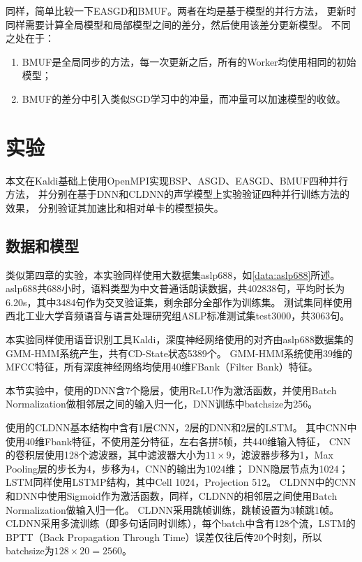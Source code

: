 同样，简单比较一下EASGD和BMUF。两者在均是基于模型的并行方法，
更新时同样需要计算全局模型和局部模型之间的差分，然后使用该差分更新模型。
不同之处在于：
\begin{enumerate}
\item BMUF是全局同步的方法，每一次更新之后，所有的Worker均使用相同的初始模型；
\item BMUF的差分中引入类似SGD学习中的冲量，而冲量可以加速模型的收敛。
\end{enumerate}

\section{实验}

本文在Kaldi基础上使用OpenMPI实现BSP、ASGD、EASGD、BMUF四种并行方法，
并分别在基于DNN和CLDNN的声学模型上实验验证四种并行训练方法的效果，
分别验证其加速比和相对单卡的模型损失。

\subsection{数据和模型}

类似第四章的实验，本实验同样使用大数据集aslp688，如\ref{data:aslp688}所述。
aslp688共688小时，语料类型为中文普通话朗读数据，共402838句，平均时长为6.20s，其中3484句作为交叉验证集，剩余部分全部作为训练集。
测试集同样使用西北工业大学音频语音与语言处理研究组ASLP标准测试集test3000，共3063句。

本实验同样使用语音识别工具Kaldi，深度神经网络使用的对齐由aslp688数据集的GMM-HMM系统产生，共有CD-State状态5389个。
GMM-HMM系统使用39维的MFCC特征，所有深度神经网络均使用40维FBank（Filter Bank）特征。

本节实验中，使用的DNN含7个隐层，使用ReLU作为激活函数，并使用Batch Normalization做相邻层之间的输入归一化，DNN训练中batchsize为256。

使用的CLDNN基本结构中含有1层CNN，2层的DNN和2层的LSTM。
其中CNN中使用40维Fbank特征，不使用差分特征，左右各拼5帧，共440维输入特征，
CNN的卷积层使用128个滤波器，其中滤波器大小为$11 \times 9$，滤波器步移为1，Max Pooling层的步长为4，步移为4，CNN的输出为1024维；
DNN隐层节点为1024；LSTM同样使用LSTMP结构，其中Cell 1024，Projection 512。
CLDNN中的CNN和DNN中使用Sigmoid作为激活函数，同样，CLDNN的相邻层之间使用Batch Normalization做输入归一化。
CLDNN采用跳帧训练，跳帧设置为3帧跳1帧。
CLDNN采用多流训练（即多句话同时训练），每个batch中含有128个流，LSTM的BPTT（Back Propagation Through Time）误差仅往后传20个时刻，所以
batchsize为$128 \times 20 = 2560$。

